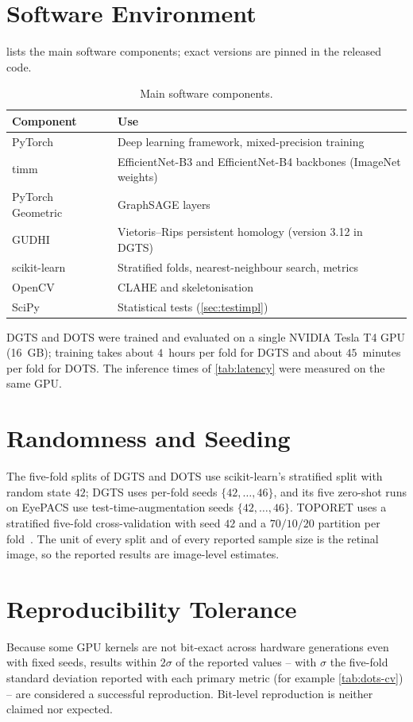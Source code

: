 \section{Software Environment}
 lists the main software components; exact versions are pinned in the
released code.
\begin{table}[!htbp]
\centering
\caption[Main software components]{Main software components.}
\label{tab:software}
\small
\begin{tabular}{@{}l P{10.4cm}@{}}
\toprule
Component & Use \\
\midrule
PyTorch~\cite{paszke2019pytorch} & Deep learning framework, mixed-precision training \\
timm & EfficientNet-B3 and EfficientNet-B4 backbones (ImageNet weights) \\
PyTorch Geometric~\cite{fey2019pyg} & GraphSAGE layers \\
GUDHI~\cite{maria2014gudhi} & Vietoris--Rips persistent homology (version 3.12 in DGTS) \\
scikit-learn~\cite{pedregosa2011sklearn} & Stratified folds, nearest-neighbour search, metrics \\
OpenCV & CLAHE and skeletonisation \\
SciPy & Statistical tests (\cref{sec:testimpl}) \\
\bottomrule
\end{tabular}
\end{table}

DGTS and DOTS were trained and evaluated on a single NVIDIA Tesla T4 GPU (16~GB); training
takes about $4$~hours per fold for DGTS and about $45$~minutes per fold for DOTS. The
inference times of \cref{tab:latency} were measured on the same GPU.

\section{Randomness and Seeding}
The five-fold splits of DGTS and DOTS use scikit-learn's stratified split with random state
$42$; DGTS uses per-fold seeds $\{42,\ldots,46\}$, and its five zero-shot runs on EyePACS use
test-time-augmentation seeds $\{42,\ldots,46\}$. TOPORET uses a stratified five-fold
cross-validation with seed $42$ and a $70/10/20$ partition per fold~\cite{belhadj2025plos}. The unit of every split and of every reported
sample size is the retinal image, so the reported results are image-level estimates.

\section{Reproducibility Tolerance}
\label{sec:tolerance}
Because some GPU kernels are not bit-exact across hardware generations even with fixed
seeds, results within $2\sigma$ of the reported values -- with $\sigma$ the five-fold
standard deviation reported with each primary metric (for example \cref{tab:dots-cv}) -- are
considered a successful reproduction. Bit-level reproduction is neither claimed nor
expected.

